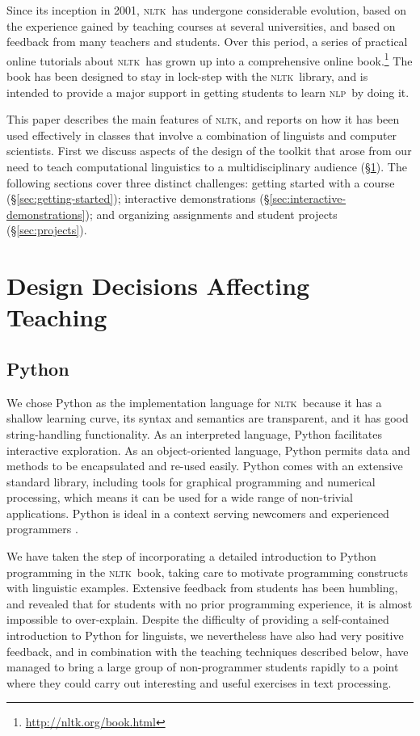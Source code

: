 \documentclass[11pt]{article}
\newcommand{\NLP}{\textsc{nlp}}
\newcommand{\NLTK}{\textsc{nltk}}
\begin{document}
Since its inception in 2001, \NLTK\ has undergone considerable
evolution, based on the experience gained by teaching courses at
several universities, and based on feedback from many teachers and
students.  Over this period, a series of practical online tutorials
about \NLTK\ has grown up into a comprehensive online book.\footnote{\url{http://nltk.org/book.html}}
The book has been designed to stay in lock-step
with the \NLTK\ library, and is intended to provide a major support in
getting students to learn \NLP\ by doing it.

This paper describes the main features of \NLTK, and reports on how it has
been used effectively in classes that involve a combination of
linguists and computer scientists.  First we discuss aspects of the
design of the toolkit that arose from our need to teach computational
linguistics to a multidisciplinary audience (\S\ref{sec:design}).
The following sections cover three distinct challenges:
getting started with a course (\S\ref{sec:getting-started});
interactive demonstrations (\S\ref{sec:interactive-demonstrations});
and organizing assignments and student projects (\S\ref{sec:projects}).

\section{Design Decisions Affecting Teaching}
\label{sec:design}

\subsection{Python}

We chose Python as the implementation language for \NLTK\ because it
has a shallow learning curve, its syntax and semantics are
transparent, and it has good string-handling functionality.  As an
interpreted language, Python facilitates interactive exploration.  As
an object-oriented language, Python permits data and methods to be
encapsulated and re-used easily.  Python comes with an extensive
standard library, including tools for graphical programming and
numerical processing, which means it can be used for a wide range of
non-trivial applications.  Python is ideal in a context serving
newcomers and experienced programmers \cite{Shannon03}.

We have taken the step of incorporating a detailed introduction to
Python programming in the \NLTK\ book, taking care to motivate
programming constructs with linguistic examples. Extensive feedback
from students has been humbling, and revealed that for students with
no prior programming experience, it is almost impossible to
over-explain. Despite the difficulty of providing a
self-contained introduction to Python for linguists, we nevertheless
have also had very positive feedback, and in combination with the
teaching techniques described below, have managed to bring a
large group of non-programmer students rapidly to a point where they
could carry out interesting and useful exercises in text processing.
\end{document}
